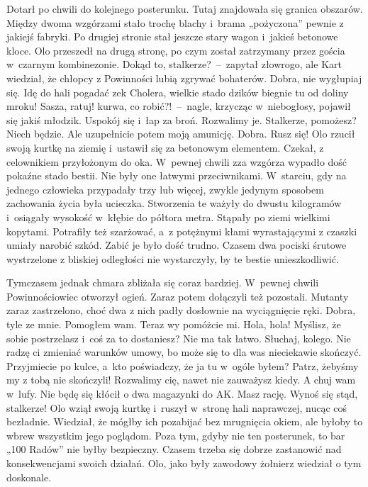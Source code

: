 \documentclass[../MAIN.tex]{subfiles}
\begin{document}
Dotarł po chwili do kolejnego posterunku. Tutaj znajdowała się granica obszarów. Między dwoma wzgórzami stało trochę blachy i~brama „pożyczona” pewnie z jakiejś fabryki. Po drugiej stronie stał jeszcze stary wagon i~jakieś betonowe kloce. Olo przeszedł na drugą stronę, po czym został zatrzymany przez gościa w~czarnym kombinezonie.
\sx Dokąd to, stalkerze?~--~zapytał złowrogo, ale Kart wiedział, że chłopcy z Powinności lubią zgrywać bohaterów.
\xx Dobra, nie wygłupiaj się. Idę do hali pogadać ze\3k
\xx Cholera, wielkie stado dzików biegnie tu od doliny mroku! Sasza, ratuj! kurwa, co robić?!~--~nagle, krzycząc w~niebogłosy, pojawił się jakiś młodzik.
\xx Uspokój się i~łap za broń. Rozwalimy je. Stalkerze, pomożesz?
\xx Niech będzie. Ale uzupełnicie potem moją amunicję.
\xx Dobra. Rusz się!
\qm
Olo rzucił swoją kurtkę na ziemię i~ustawił się za betonowym elementem. Czekał, z celownikiem przyłożonym do oka. W~pewnej chwili zza wzgórza wypadło dość pokaźne stado bestii. Nie były one łatwymi przeciwnikami. W~starciu, gdy na jednego człowieka przypadały trzy lub więcej, zwykle jedynym sposobem zachowania życia była ucieczka. Stworzenia te ważyły do dwustu kilogramów i~osiągały wysokość w~kłębie do półtora metra. Stąpały po ziemi wielkimi kopytami. Potrafiły też szarżować, a~z potężnymi kłami wyrastającymi z czaszki umiały narobić szkód. Zabić je było dość trudno. Czasem dwa pociski śrutowe wystrzelone z bliskiej odległości nie wystarczyły, by te bestie unieszkodliwić.

Tymczasem jednak chmara zbliżała się coraz bardziej. W~pewnej chwili Powinnościowiec otworzył ogień. Zaraz potem dołączyli też pozostali. Mutanty zaraz zastrzelono, choć dwa z nich padły dosłownie na wyciągnięcie ręki.
\sx Dobra, tyle ze mnie. Pomogłem wam. Teraz wy pomóżcie mi.
\xx Hola, hola! Myślisz, że sobie postrzelasz i~coś za to dostaniesz? Nie ma tak łatwo.
\xx Słuchaj, kolego. Nie radzę ci zmieniać warunków umowy, bo może się to dla was nieciekawie skończyć. Przyjmiecie po kulce, a~kto poświadczy, że ja tu w~ogóle byłem?
\xx Patrz, żebyśmy my z tobą nie skończyli! Rozwalimy cię, nawet nie zauważysz kiedy.
\xx A chuj wam w~lufy. Nie będę się kłócił o dwa magazynki do AK.
\xx Masz rację. Wynoś się stąd, stalkerze!
\qm
Olo wziął swoją kurtkę i~ruszył w~stronę hali naprawczej, nucąc coś bezładnie. Wiedział, że mógłby ich pozabijać bez mrugnięcia okiem, ale byłoby to wbrew wszystkim jego poglądom. Poza tym, gdyby nie ten posterunek, to bar „100 Radów” nie byłby bezpieczny. Czasem trzeba się dobrze zastanowić nad konsekwencjami swoich działań. Olo, jako były zawodowy żołnierz wiedział o tym doskonale.
\end{document}
